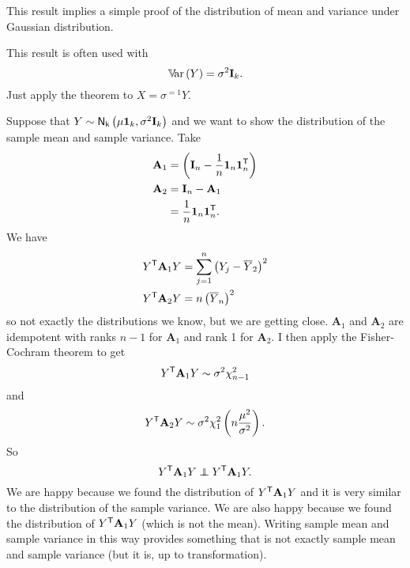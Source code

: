 \documentclass[12pt]{report}
\begin{document}
This result implies a simple proof of the distribution of mean and variance under Gaussian distribution.
\begin{remark}
	This result is often used with 
	\begin{equation*}
		\mathbb{V}\!\mathrm{ar}\,(Y)=\sigma^{2}\mathbf{I}_{k}.
	\end{equation*}
	Just apply the theorem to $X=\sigma^{=1}Y$.
\end{remark}
\begin{remark}
	Suppose that $Y\sim\mathsf{N}_{\mathsf{k}}\left(\mu\mathbf{1}_{k},\sigma^{2}\mathbf{I}_{k}\right)$ and we want to show the distribution of the sample mean and sample variance. Take
	\begin{align*}
		\mathbf{A}_{1}&=\left(\mathbf{I}_{n}-\frac{1}{n}\mathbf{1}_{n}\mathbf{1}_{n}^{\mathsf{T}}\right)\\
		\mathbf{A}_{2}&=\mathbf{I}_{n}-\mathbf{A}_{1}\\
		&=\frac{1}{n}\mathbf{1}_{n}\mathbf{1}_{n}^{\mathsf{T}}.
	\end{align*}
	We have
	\begin{align*}
		Y^{\mathsf{T}}\mathbf{A}_{1}Y&=\sum_{j=1}^{n}\left(Y_{j}-\overline{Y}_{2}\right)^{2}\\
		Y^{\mathsf{T}}\mathbf{A}_{2}Y&=n\left(\overline{Y}_{n}\right)^{2}	
	\end{align*}
	so not exactly the distributions we know, but we are getting close. $\mathbf{A}_{1}$ and $\mathbf{A}_{2}$ are idempotent with ranks $n-1$ for $\mathbf{A}_{1}$ and rank 1 for $\mathbf{A}_{2}$. I then apply the Fisher-Cochram theorem to get
	\begin{equation*}
		Y^{\mathsf{T}}\mathbf{A}_{1}Y\sim\sigma^{2}\chi^{2}_{n-1}
	\end{equation*}
	and
	\begin{equation*}
			Y^{\mathsf{T}}\mathbf{A}_{2}Y\sim\sigma^{2}\chi^{2}_{1}\left(n\frac{\mu^{2}}{\sigma^{2}}\right).
	\end{equation*}
	So
	\begin{equation*}
			Y^{\trsp}\mathbf{A}_{1}Y\indep	Y^{\trsp}\mathbf{A}_{1}Y.
	\end{equation*}
	We are happy because we found the distribution of $	Y^{\mathsf{T}}\mathbf{A}_{1}Y$ and it is very similar to the distribution of the sample variance. We are also happy because we found the distribution of $	Y^{\mathsf{T}}\mathbf{A}_{1}Y$ (which is not the mean). Writing sample mean and sample variance in this way provides something that is not exactly sample mean and sample variance (but it is, up to transformation).
\end{remark}
\end{document}
